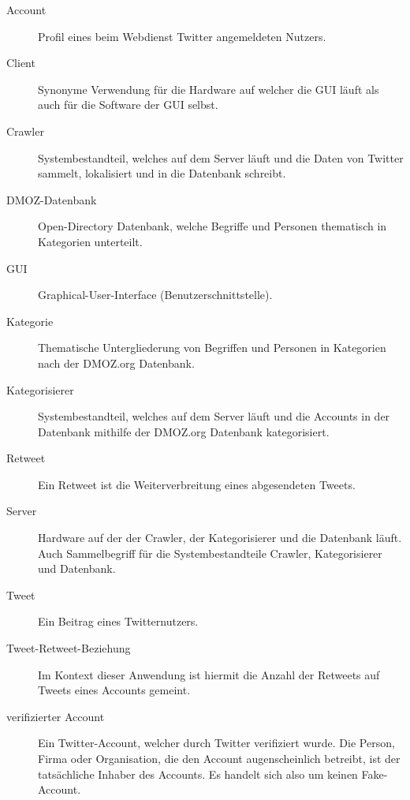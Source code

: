 
\begin{description}
	\item[Account] Profil eines beim Webdienst Twitter angemeldeten Nutzers.
	\item[Client] Synonyme Verwendung für die Hardware auf welcher die GUI läuft als auch für die Software der GUI selbst.
	\item[Crawler] Systembestandteil, welches auf dem Server läuft und die Daten von Twitter sammelt, lokalisiert und in die Datenbank schreibt.
	\item [DMOZ-Datenbank] Open-Directory Datenbank, welche Begriffe und Personen thematisch in Kategorien unterteilt.
	\item[GUI] Graphical-User-Interface (Benutzerschnittstelle).
	\item[Kategorie] Thematische Untergliederung von Begriffen und Personen in Kategorien nach der DMOZ.org Datenbank.
	\item[Kategorisierer] Systembestandteil, welches auf dem Server läuft und die Accounts in der Datenbank mithilfe der DMOZ.org Datenbank kategorisiert.
	\item[Retweet] Ein Retweet ist die Weiterverbreitung eines abgesendeten Tweets.
	\item[Server] Hardware auf der der Crawler, der Kategorisierer und die Datenbank läuft. Auch Sammelbegriff für die Systembestandteile Crawler, Kategorisierer und Datenbank.
	\item[Tweet] Ein Beitrag eines Twitternutzers.
	\item[Tweet-Retweet-Beziehung] Im Kontext dieser Anwendung ist hiermit die Anzahl der Retweets auf Tweets eines Accounts gemeint. 
	\item[verifizierter Account] Ein Twitter-Account, welcher durch Twitter verifiziert wurde. Die Person, Firma oder Organisation, die den Account augenscheinlich betreibt, ist der tatsächliche Inhaber des Accounts. Es handelt sich also um keinen Fake-Account.
\end{description}
